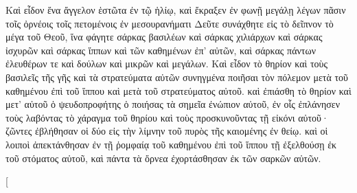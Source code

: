 \begin{pages}
\begin{Rightside}
		\pend
		\pstart
		Καὶ εἶδον ἕνα ἄγγελον ἑστῶτα ἐν τῷ ἡλίῳ, καὶ ἔκραξεν ἐν φωνῇ μεγάλῃ λέγων πᾶσιν τοῖς ὀρνέοις τοῖς πετομένοις ἐν μεσουρανήματι Δεῦτε συνάχθητε εἰς τὸ δεῖπνον τὸ μέγα τοῦ Θεοῦ, ἵνα φάγητε σάρκας βασιλέων καὶ σάρκας χιλιάρχων καὶ σάρκας ἰσχυρῶν καὶ σάρκας ἵππων καὶ τῶν καθημένων ἐπ’ αὐτῶν, καὶ σάρκας πάντων ἐλευθέρων τε καὶ δούλων καὶ μικρῶν καὶ μεγάλων.
		\pend
		\pstart
		Καὶ εἶδον τὸ θηρίον καὶ τοὺς βασιλεῖς τῆς γῆς καὶ τὰ στρατεύματα αὐτῶν συνηγμένα ποιῆσαι τὸν πόλεμον μετὰ τοῦ καθημένου ἐπὶ τοῦ ἵππου καὶ μετὰ τοῦ στρατεύματος αὐτοῦ. καὶ ἐπιάσθη τὸ θηρίον καὶ μετ’ αὐτοῦ ὁ ψευδοπροφήτης ὁ ποιήσας τὰ σημεῖα ἐνώπιον αὐτοῦ, ἐν οἷς ἐπλάνησεν τοὺς λαβόντας τὸ χάραγμα τοῦ θηρίου καὶ τοὺς προσκυνοῦντας τῇ εἰκόνι αὐτοῦ· ζῶντες ἐβλήθησαν οἱ δύο εἰς τὴν λίμνην τοῦ πυρὸς τῆς καιομένης ἐν θείῳ. καὶ οἱ λοιποὶ ἀπεκτάνθησαν ἐν τῇ ῥομφαίᾳ τοῦ καθημένου ἐπὶ τοῦ ἵππου τῇ ἐξελθούσῃ ἐκ τοῦ στόματος αὐτοῦ, καὶ πάντα τὰ ὄρνεα ἐχορτάσθησαν ἐκ τῶν σαρκῶν αὐτῶν.	
		\pend
        \endnumbering
    \end{Rightside}
    \begin{Leftside}
        \beginnumbering
        \pstart[

\end{Leftside}
\end{pages}

